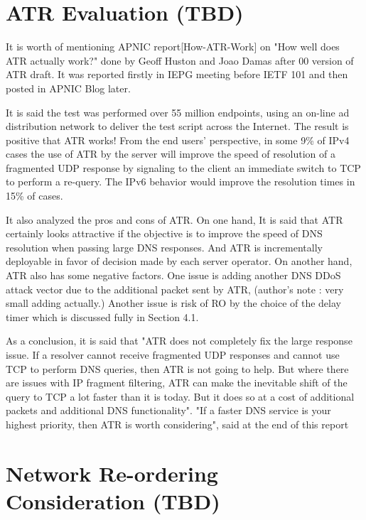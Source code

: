 \section{ATR Evaluation (TBD)}


   It is worth of mentioning APNIC report[How-ATR-Work] on "How well
   does ATR actually work?" done by Geoff Huston and Joao Damas after 00
   version of ATR draft.  It was reported firstly in IEPG meeting before
   IETF 101 and then posted in APNIC Blog later.

   It is said the test was performed over 55 million endpoints, using an
   on-line ad distribution network to deliver the test script across the
   Internet.  The result is positive that ATR works!  From the end
   users' perspective, in some 9\% of IPv4 cases the use of ATR by the
   server will improve the speed of resolution of a fragmented UDP
   response by signaling to the client an immediate switch to TCP to
   perform a re-query.  The IPv6 behavior would improve the resolution
   times in 15\% of cases.

   It also analyzed the pros and cons of ATR.  On one hand, It is said
   that ATR certainly looks attractive if the objective is to improve
   the speed of DNS resolution when passing large DNS responses.  And
   ATR is incrementally deployable in favor of decision made by each
   server operator.  On another hand, ATR also has some negative
   factors.  One issue is adding another DNS DDoS attack vector due to
   the additional packet sent by ATR, (author's note : very small adding
   actually.)  Another issue is risk of RO by the choice of the delay
   timer which is discussed fully in Section 4.1.

   As a conclusion, it is said that "ATR does not completely fix the
   large response issue.  If a resolver cannot receive fragmented UDP
   responses and cannot use TCP to perform DNS queries, then ATR is not
   going to help.  But where there are issues with IP fragment
   filtering, ATR can make the inevitable shift of the query to TCP a
   lot faster than it is today.  But it does so at a cost of additional
   packets and additional DNS functionality".  "If a faster DNS service
   is your highest priority, then ATR is worth considering", said at the
   end of this report


\section{Network Re-ordering Consideration (TBD)}

